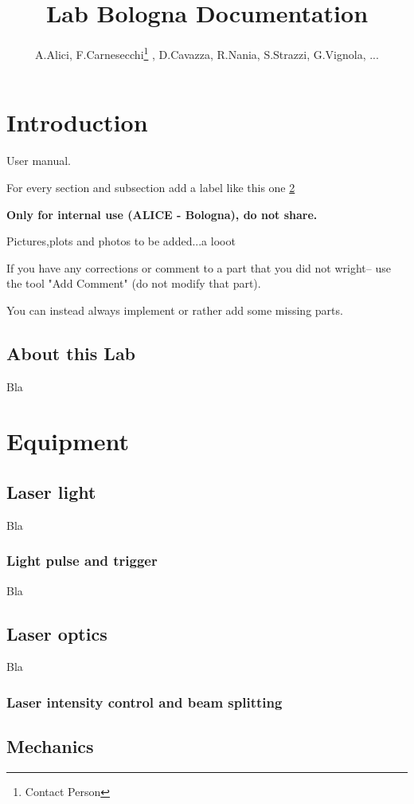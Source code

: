 \documentclass{article}
\title{Lab Bologna Documentation}
\author{A.Alici, F.Carnesecchi\footnote{Contact Person} , D.Cavazza, R.Nania, S.Strazzi, G.Vignola, ...}
\begin{document}
\maketitle
\tableofcontents


\section{Introduction} 
User manual.

For every section and subsection add a label like this one \ref{sec:Equi}

\textbf{Only for internal use (ALICE - Bologna), do not share.}

Pictures,plots and photos to be added...a looot

If you have any corrections or comment to a part that you did not wright-- use the tool "Add Comment" (do not modify that part).

You can instead always implement or rather add some missing parts.

\subsection{About this Lab}
Bla 


\section{Equipment} 
\label{sec:Equi}


\subsection{Laser light}
Bla

\subsubsection{Light pulse and trigger} 
Bla

\subsection{Laser optics} 
Bla

\subsubsection {Laser intensity control and beam splitting } 


\subsection {Mechanics}
\end{document}

